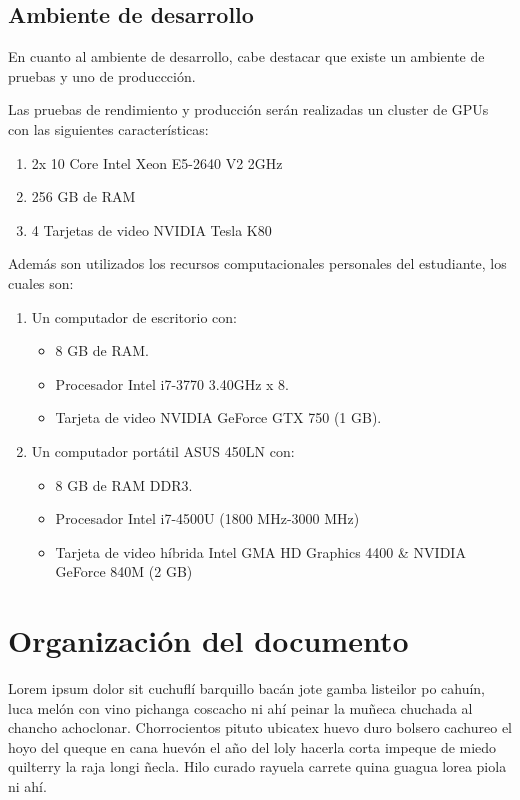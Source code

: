 
\subsection{Ambiente de desarrollo}

En cuanto al ambiente de desarrollo, cabe destacar que existe un ambiente de pruebas y uno de produccción.

Las pruebas de rendimiento y producción serán realizadas un cluster de GPUs con las siguientes características:


\begin{enumerate}
\item 2x 10 Core Intel Xeon E5-2640 V2 2GHz
\item 256 GB de RAM
\item 4 Tarjetas de video NVIDIA Tesla K80
\end{enumerate}

Además son utilizados los recursos computacionales personales del estudiante, los cuales son:

\begin{enumerate}
\item Un computador de escritorio con:
\begin{itemize}
\item 8 GB de RAM.
\item Procesador Intel i7-3770 3.40GHz x 8. 
\item Tarjeta de video NVIDIA GeForce GTX 750 (1 GB).
\end{itemize}
\item Un computador portátil ASUS 450LN con:
\begin{itemize}
\item 8 GB de RAM DDR3.
\item Procesador Intel i7-4500U (1800 MHz-3000 MHz)
\item Tarjeta de video híbrida Intel GMA HD Graphics 4400 \& NVIDIA GeForce 840M (2 GB)
\end{itemize}
\end{enumerate}

\section{Organizaci\'on del documento}
\label{intro:organizacion}
Lorem ipsum dolor sit cuchufl\'i barquillo bac\'an jote gamba listeilor po cahu\'in, luca mel\'on con vino pichanga coscacho ni ah\'i peinar la muñeca chuchada al chancho achoclonar. Chorrocientos pituto ubicatex huevo duro bolsero cachureo el hoyo del queque en cana huev\'on el año del loly hacerla corta impeque de miedo quilterry la raja longi ñecla. Hilo curado rayuela carrete quina guagua lorea piola ni ah\'i.